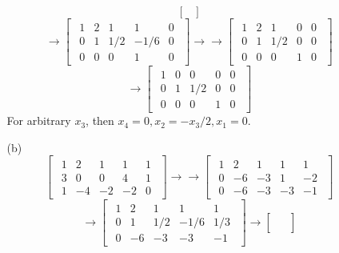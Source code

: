 \documentclass[12pt]{article}
\begin{document}
\begin{itemize}
\begin{itemize}
$$\begin{bmatrix}
\end{bmatrix}$$
$$\rightarrow \begin{bmatrix}
\begin{array}{cccc|c}
1 & 2 & 1 & 1 & 0 \\
0 & 1 & 1/2 & -1/6 & 0 \\
0 & 0 & 0 & 1 & 0
\end{array}
\end{bmatrix}\rightarrow\rightarrow \begin{bmatrix}
\begin{array}{cccc|c}
1 & 2 & 1 & 0 & 0 \\
0 & 1 & 1/2 & 0 & 0 \\
0 & 0 & 0 & 1 & 0
\end{array}
\end{bmatrix}$$
$$\rightarrow \begin{bmatrix}
\begin{array}{cccc|c}
1 & 0 & 0 & 0 & 0 \\
0 & 1 & 1/2 & 0 & 0 \\
0 & 0 & 0 & 1 & 0
\end{array}
\end{bmatrix}$$
For arbitrary $x_3$, then $x_4 = 0, x_2 = -x_3/2, x_1 = 0$.
\item[(b)]
$$\begin{bmatrix}
\begin{array}{cccc|c}
1 & 2 & 1 & 1 & 1 \\
3 & 0 & 0 & 4 & 1 \\
1 & -4 & -2 & -2 & 0
\end{array}
\end{bmatrix} \rightarrow\rightarrow \begin{bmatrix}
\begin{array}{cccc|c}
1 & 2 & 1 & 1 & 1 \\
0 & -6 & -3 & 1 & -2 \\
0 & -6 & -3 & -3 & -1
\end{array}
\end{bmatrix}$$
$$ \rightarrow \begin{bmatrix}
\begin{array}{cccc|c}
1 & 2 & 1 & 1 & 1 \\
0 & 1 & 1/2 & -1/6 & 1/3 \\
0 & -6 & -3 & -3 & -1
\end{array}
\end{bmatrix} \rightarrow \begin{bmatrix}
\begin{array}{cccc|c}

\end{array}
\end{bmatrix}$$
\end{itemize}
\end{itemize}
\end{document}
